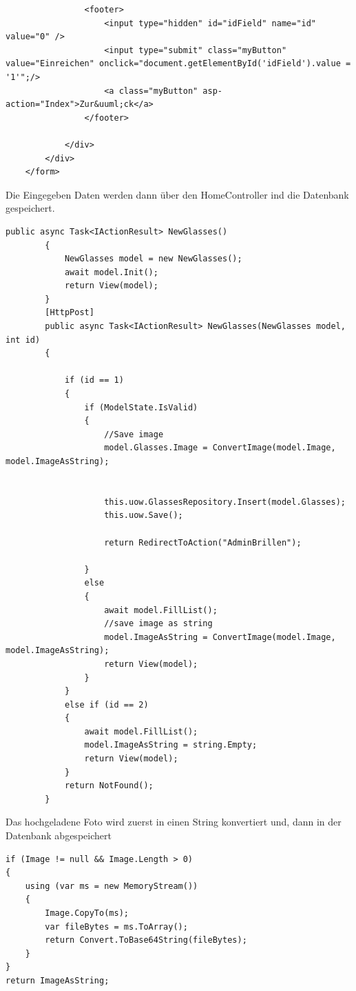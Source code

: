 \begin{itemize}
\begin{lstlisting}
                <footer>
                    <input type="hidden" id="idField" name="id" value="0" />
                    <input type="submit" class="myButton" value="Einreichen" onclick="document.getElementById('idField').value = '1'";/>
                    <a class="myButton" asp-action="Index">Zur&uuml;ck</a>
                </footer>

            </div>
        </div>
    </form>
\end{lstlisting}   
Die Eingegeben Daten werden dann über den HomeController ind die Datenbank gespeichert.
\begin{lstlisting}
public async Task<IActionResult> NewGlasses()
        {
            NewGlasses model = new NewGlasses();
            await model.Init();
            return View(model);
        }
        [HttpPost]
        public async Task<IActionResult> NewGlasses(NewGlasses model, int id)
        {

            if (id == 1)
            {
                if (ModelState.IsValid)
                {
                    //Save image
                    model.Glasses.Image = ConvertImage(model.Image, model.ImageAsString);


                    this.uow.GlassesRepository.Insert(model.Glasses);
                    this.uow.Save();

                    return RedirectToAction("AdminBrillen");

                }
                else
                {
                    await model.FillList();
                    //save image as string
                    model.ImageAsString = ConvertImage(model.Image, model.ImageAsString);
                    return View(model);
                }
            }
            else if (id == 2)
            {
                await model.FillList();
                model.ImageAsString = string.Empty;
                return View(model);
            }
            return NotFound();
        }

\end{lstlisting}
Das hochgeladene Foto wird zuerst in einen String konvertiert und, dann in der Datenbank abgespeichert
\begin{lstlisting}
if (Image != null && Image.Length > 0)
{
	using (var ms = new MemoryStream())
	{
		Image.CopyTo(ms);
		var fileBytes = ms.ToArray();
		return Convert.ToBase64String(fileBytes);
	}
}
return ImageAsString;
\end{lstlisting}


\end{itemize}
